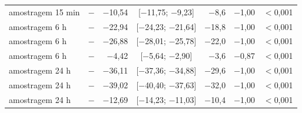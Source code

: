 \begin{tabular}{@{}llrcrrr@{}}
amostragem 15 min & \polD{} $-$ \polA{} & $-$10,54 & [$-$11,75; $-$9,23] & $-$8,6 & $-$1,00 & $<$0,001 \\
amostragem 6 h & \polBOR{} $-$ \polA{} & $-$22,94 & [$-$24,23; $-$21,64] & $-$18,8 & $-$1,00 & $<$0,001 \\
amostragem 6 h & \polC{} $-$ \polA{} & $-$26,88 & [$-$28,01; $-$25,78] & $-$22,0 & $-$1,00 & $<$0,001 \\
amostragem 6 h & \polD{} $-$ \polA{} & $-$4,42 & [$-$5,64; $-$2,90] & $-$3,6 & $-$0,87 & $<$0,001 \\
amostragem 24 h & \polBOR{} $-$ \polA{} & $-$36,11 & [$-$37,36; $-$34,88] & $-$29,6 & $-$1,00 & $<$0,001 \\
amostragem 24 h & \polC{} $-$ \polA{} & $-$39,02 & [$-$40,40; $-$37,63] & $-$32,0 & $-$1,00 & $<$0,001 \\
amostragem 24 h & \polD{} $-$ \polA{} & $-$12,69 & [$-$14,23; $-$11,03] & $-$10,4 & $-$1,00 & $<$0,001 \\
\bottomrule
\end{tabular}

